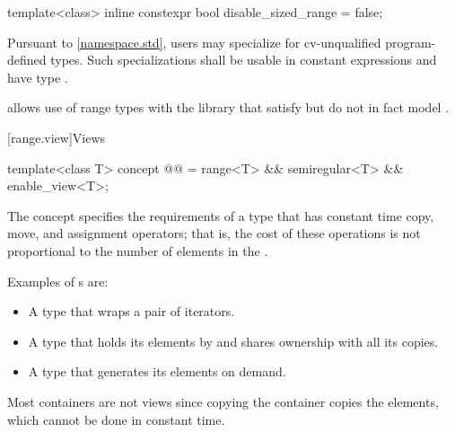 %
\begin{itemdecl}
template<class>
  inline constexpr bool disable_sized_range = false;
\end{itemdecl}

\begin{itemdescr}
\pnum
\remarks
Pursuant to \ref{namespace.std},
users may specialize 
for cv-unqualified program-defined types.
Such specializations shall
be usable in constant expressions and
have type .

\pnum
\begin{note}
 allows use of range types with the library
that satisfy but do not in fact model .
\end{note}
\end{itemdescr}

[range.view]{Views}

\begin{itemdecl}
template<class T>
  concept @@ =
    range<T> && semiregular<T> && enable_view<T>;
\end{itemdecl}

\begin{itemdescr}
\pnum
The  concept specifies the requirements of a  type
that has constant time copy, move, and assignment operators; that is, the cost of
these operations is not proportional to the number of elements in the
.

\pnum
\begin{example}
Examples of s are:
\begin{itemize}
\item A  type that wraps a pair of iterators.

\item A  type that holds its elements by 
and shares ownership with all its copies.

\item A  type that generates its elements on demand.
\end{itemize}

Most containers are not views since
copying the container copies the elements,
which cannot be done in constant time.
\end{example}
\end{itemdescr}

